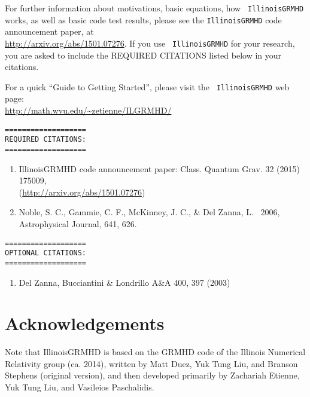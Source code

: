 \documentclass{article}
\begin{document}
For further information about motivations, basic equations, how {\tt
  IllinoisGRMHD} works, as well as basic code test results, please see
the {\tt IllinoisGRMHD} code announcement paper, at
\\ \url{http://arxiv.org/abs/1501.07276}. If you use {\tt
  IllinoisGRMHD} for your research, you are asked to include the
REQUIRED CITATIONS listed below in your citations.

For a quick ``Guide to Getting Started'', please visit the {\tt
  IllinoisGRMHD} web page:\\ \url{http://math.wvu.edu/~zetienne/ILGRMHD/}

\begin{verbatim}
===================
REQUIRED CITATIONS:
===================
\end{verbatim}

\begin{enumerate}
\item IllinoisGRMHD code announcement paper: 
Class. Quantum Grav. 32 (2015) 175009, \\(\url{http://arxiv.org/abs/1501.07276})

\item Noble, S. C., Gammie, C. F., McKinney, J. C., \& Del Zanna, L. \ 2006, 
        Astrophysical Journal, 641, 626.
\end{enumerate}

\begin{verbatim}
===================
OPTIONAL CITATIONS:
===================
\end{verbatim}
\begin{enumerate}
\item Del Zanna, Bucciantini \& Londrillo A\&A 400, 397 (2003)
\end{enumerate}

\section{Acknowledgements}

Note that IllinoisGRMHD
is based on the GRMHD code of the Illinois Numerical Relativity
group (ca. 2014), written by Matt Duez, Yuk Tung Liu, and Branson
Stephens (original version), and then developed primarily by
Zachariah Etienne, Yuk Tung Liu, and Vasileios Paschalidis.



\end{document}
